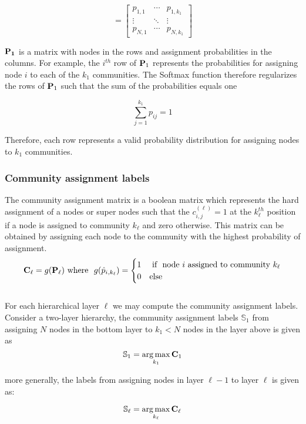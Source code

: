 \documentclass[a4paper,12pt]{article}
\DeclareMathOperator*{\argmax}{arg\,max}
\begin{document}
			\[= \begin{bmatrix}
				p_{1, 1} & \cdots & p_{1, k_1} \\
				\vdots  & \ddots & \vdots \\
				p_{N, 1} & \cdots & p_{N, k_1} 
			\end{bmatrix}\]
		
			$\bf P_1$ is a matrix with nodes in the rows and assignment probabilities in the columns. For example, the $i^{th}$ row of ${\bf P}_1$ represents the probabilities for assigning  node $i$ to each of the $k_1$ communities. The Softmax function therefore regularizes the rows of ${\bf P}_1$ such that the sum of the probabilities equals one 
			
			\[ \sum_{j = 1}^{k_1} p_{ij} = 1\]
			
			Therefore, each row represents a valid probability distribution for assigning nodes to $k_1$ communities. \\
		
		\subsubsection*{Community assignment labels}
			The community assignment matrix is a boolean matrix which represents the hard assignment of a nodes or super nodes such that the $c_{i,j}^{(\ell)} = 1$ at the $k_\ell^{th}$ position if a node is assigned to community $k_\ell$ and zero otherwise. This matrix can be obtained by assigning each node to the community with the highest probability of assignment.  
			\[{\bf C}_{\ell} = g({\bf P}_{\ell}) \ \text{where} \ \  g(\hat{p}_{i,k_\ell}) = 
			\begin{cases} 1 & \ \text{if} \ \ \text{node $i$ assigned to community $k_\ell$} \\
				0 & \text{else} 
			\end{cases}\]\\
			
			
			For each hierarchical layer $\ell$ we may compute the community assignment labels. Consider a two-layer hierarchy, the community assignment labels $\mathbb{S}_1$ from assigning $N$ nodes in the bottom layer to $k_1 < N$ nodes in the layer above is given as 
			\[\mathbb{S}_1 = \argmax_{k_1} {\bf C}_1 \]
			
			more generally, the labels from assigning nodes in layer $\ell - 1$ to layer $\ell$ is given as:
			
			\[ \mathbb{S}_\ell = \argmax_{k_\ell} {\bf C}_{\ell}\]
		
\end{document}
